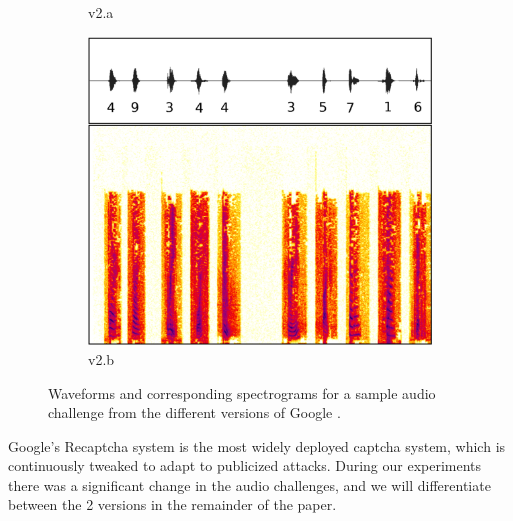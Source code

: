 \begin{figure}[tp]
\begin{subfigure}{0.3\textwidth}
        \caption{\re v2.a}
        \label{fig:recaptcha2a}
\end{subfigure}\hspace{0.03\textwidth}
\begin{subfigure}{0.3\textwidth}
        \includegraphics[width=\textwidth]{figures/recaptcha2a.pdf}
        \caption{\re v2.b}
        \label{fig:recaptcha2b}
\end{subfigure}
\caption{Waveforms and corresponding spectrograms for a sample audio challenge from the different versions of Google \re.}
\label{fig:examples}
\end{figure}

Google's Recaptcha system is the most widely deployed captcha system, which is continuously tweaked to 
adapt to publicized attacks. During our experiments there was a significant change in the audio challenges,
and we will differentiate between the 2 versions in the remainder of the paper.


